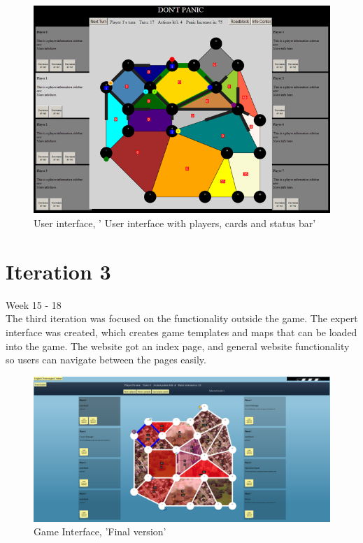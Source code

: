 \begin{figure}[H]
  \centering
    \includegraphics[width=1.0\textwidth]{img/earlyVersion.png}
  \caption{User interface, ' User interface with players, cards and status bar'} 
  \label{fig:earlyversion}
\end{figure}

\section{Iteration 3}

Week 15 - 18\\
\newline
The third iteration was focused on the functionality outside the game. The expert interface was created, which creates game templates and maps that can be loaded into the game. The website got an index page, and general website functionality so users can navigate between the pages easily.\\

\begin{figure}[H]
  \centering
    \includegraphics[width=1.0\textwidth]{img/gamefinal.png}
  \caption{Game Interface, 'Final version'} 
  \label{fig:gamefinal}
\end{figure}


